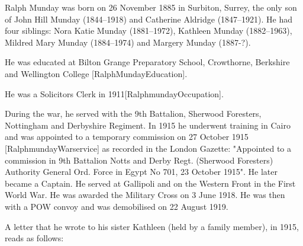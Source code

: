 
Ralph Munday was born on 26 November 1885 in Surbiton, Surrey,  the only son of John Hill Munday (1844--1918) and Catherine Aldridge (1847--1921). He had four siblings: Nora Katie Munday (1881--1972), Kathleen Munday (1882--1963), Mildred Mary Munday (1884--1974) and Margery Munday (1887-?).

He was educated at Bilton Grange Preparatory School, Crowthorne, Berkshire and Wellington College [RalphMundayEducation].

He was a Solicitors Clerk in 1911[RalphmundayOccupation]. 

During the war, he served with the 9th Battalion, Sherwood Foresters, Nottingham and Derbyshire Regiment. In 1915 he underwent training in Cairo and was appointed to a temporary commission on 27 October 1915 [RalphmundayWarservice] as recorded in the London Gazette:  "Appointed to a commission in 9th Battalion Notts and Derby Regt. (Sherwood Foresters) Authority General Ord. Force in Egypt No 701, 23 October 1915".  He later became a Captain. He  served at Gallipoli and on the Western Front in the First World War. He was awarded the Military Cross on 3 June 1918. He was then with a POW convoy and was demobilised on 22 August 1919.

A letter that he wrote to his sister Kathleen (held by a family member), in 1915, reads as follows:

